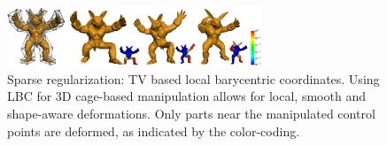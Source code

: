 \begin{figure}[ht]
  \centering
  \includegraphics[width=3in]{images/LBC_L1}
  \caption{Sparse regularization: TV based local barycentric coordinates\cite{zhang2014local}. Using LBC for 3D cage-based manipulation allows for local, smooth and shape-aware deformations. Only parts near the manipulated control points are deformed, as indicated by the color-coding.}
  \label{fig:LBC}
\end{figure}
